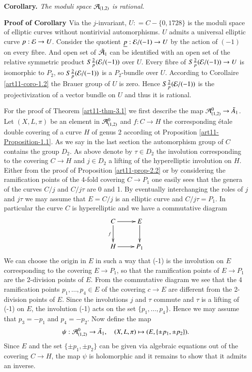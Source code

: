\medskip
\noindent
{\bfseries {} Corollary. \label{art11-coro-3.2}} \textit{The moduli space $\mathcal{A}_{(1,2)}$ is rational.}


\medskip
\noindent
{\bfseries   Proof of Corollary  \label{art11-Proof of Coro-3.2}} Via the $j$-invariant, $U : = C-\{0,1728\}$ is the moduli space of elliptic curves without nontirivial automorphisms. $U$ admits a universal elliptic curve $p:\mathcal{E} \rightarrow U$. Consider the quotient $\underline{p} : \mathcal{E} /(-1)\rightarrow U$ by the action of $(-1)$ on every fibre. And open set of $\tilde{\mathcal{A}}_{1}$ can be identified with an open set of the relative symmetric product $S\tfrac{2}{p}(\mathcal{E} /(-1))$ over $U$. Every fibre of $S\tfrac{2}{p}(\mathcal{E} /(-1))\rightarrow U$ is isomorphic to $P_{2}$, so $S\tfrac{2}{p}(\mathcal{E} /(-1))$ is a $P_{2}$-bundle over $U$. According to \cite{art11-keyG} Corollaire
\ref{art11-coro-1.2} the Brauer group of $U$ is zero. Hence $S\frac{2}{p}(\mathcal{E}/(-1))$ is the projectivization of a vector bundle on $U$ and thus it is rational. 

For the proof of Theorem \ref{art11-thm-3.1} we first describe the map $\mathcal{A}^{0}_{(1,2)} \rightarrow \tilde{A}_{1}$. Let $(X, L, \pi)$ be an element in $\mathcal{A}^{0}_{(1,2)}$ and $f: C \rightarrow H$ the corresponding \'etale double covering of a curve $H$ of genus 2 according ot Proposition \ref{art11-Proposition-1.1}. As we say in the last section the automorphism group of $C$ contains the group $D_{2}$. As above denote by $\tau \in D_{2}$ the involution corresponding to the covering $C \rightarrow H$ and $j \in D_{2}$ a lifting of the hyperelliptic involution on $H$. Either from the proof of Proposition \ref{art11-prop-2.2} or by considering the ramification points of the 4-fold covering $C\rightarrow P_{1}$ one easily sees that the genera of the curves $C/j$ and $C/j\tau$ are 0 and 1. By eventually interchanging the roles of $j$ and $j\tau$ we may assume that $E=C/j$ is an elliptic curve and $C/j\tau = P_{1}$. In particular the curve $C$ is hyperelliptic and we have a commutative diagram
$$
\xymatrix{
C \ar[r] \ar[d]_{f} & E \ar[d]\\
H \ar[r] & P_{1}}  
$$
We can choose the origin in $E$ in such a way that (-1) is the involution on $E$ corresponding to the covering $E \rightarrow P_{1}$, so that the ramification points of $E \rightarrow P_{1}$ are the 2-division points of $E$. From the commutative diagram we see that the 4 ramification points $p_{1}, \ldots, p_{4} \in E$ of the covering $c\rightarrow E$ are different from the 2-division points of $E$. Since the involutions $j$ and $\tau$ commute and $\tau$ is a lifting of (-1) on $E$, the involution (-1) acts on the set $\{p_{1}, \ldots,p_{4}\}$. Hence we may assume that $p_{3} =-p_{1}$ and $p_{4}=-p_{2}$. Now define the map
$$
\psi : \mathcal{A}_{(1,2)}^{0} \rightarrow \tilde{A}_{1}, \quad (X, L, \pi)\mapsto (E, \{\pm p_{1}, \pm p_{2}\}).
$$ 
Since $E$ and the set $\{\pm p_{1}, \pm p_{2}\}$ can be given via algebraic equations out of the covering
$C\rightarrow H$, the map $\psi$ is holomorphic and it remains to show that it admits an inverse.

